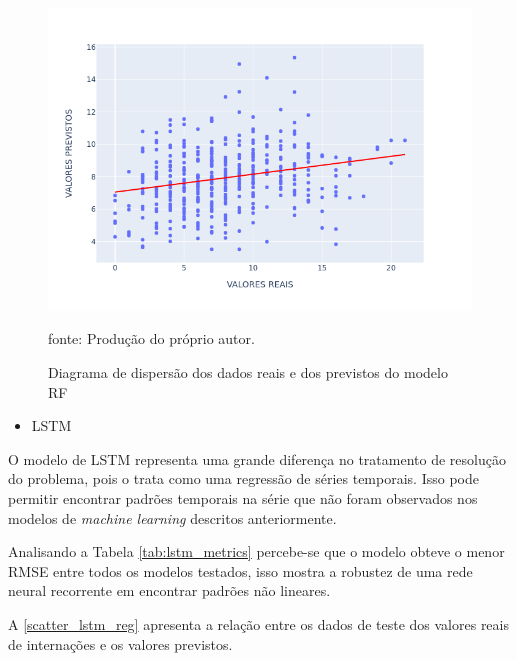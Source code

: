\documentclass[
  12pt,		%
  a4paper,	%
  openright,%
  oneside,	%
  chapter=TITLE,		%
  section=TITLE,		%
  english,	%
  french,	%
  spanish,	%
  brazil	%
]{abntex2}
\begin{document}
    \begin{figure}[ht]
        \centering
        \caption{Diagrama de dispersão dos dados reais e dos previstos do modelo RF}
        \includegraphics[width=12cm]{../reports/figures/scatter_rf_reg.png}
        \label{scatter_rf_reg}
        \par
        {\small fonte: Produção do próprio autor.}
    \end{figure}

    \begin{itemize}
        \item LSTM
    \end{itemize}

    O modelo de LSTM representa uma grande diferença no tratamento de resolução do problema, pois o trata
    como uma regressão de séries temporais. Isso pode permitir encontrar padrões temporais na
    série que não foram observados nos modelos de \textit{machine learning} descritos anteriormente.

    Analisando a Tabela \ref*{tab:lstm_metrics} percebe-se que o modelo obteve o menor
    RMSE entre todos os modelos testados, isso mostra a robustez de uma rede neural recorrente
    em encontrar padrões não lineares.

    

    A \ref*{scatter_lstm_reg} apresenta a relação entre os dados de teste dos valores reais de internações e os valores previstos.
\end{document}
